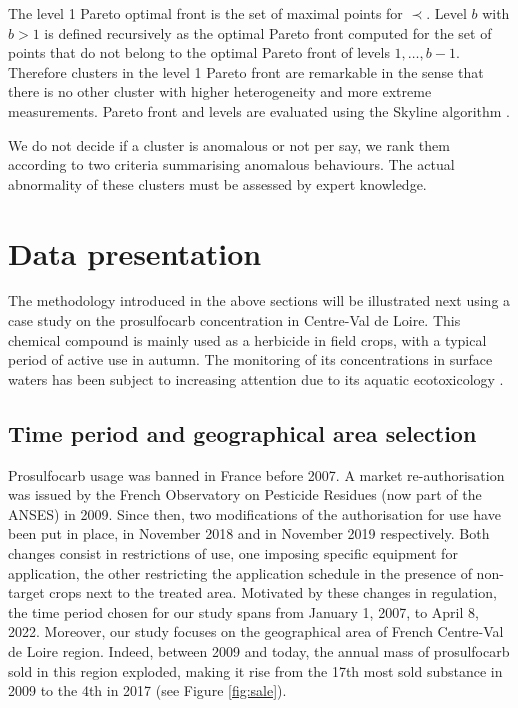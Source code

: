 The level 1 Pareto optimal front is the set of maximal points for $\prec$. Level $b$ with $b>1$ is defined recursively as the optimal Pareto front computed for the set of points that do not belong to the optimal Pareto front of levels $1,\ldots,b-1$. 
Therefore clusters in the level 1 Pareto front are remarkable in the sense that there is no other cluster with higher heterogeneity and more extreme measurements. Pareto front and levels are evaluated using the Skyline algorithm \cite{914855,endres2015scalagon}. 

We do not decide if a cluster is anomalous or not per say, we rank them according to two criteria summarising anomalous behaviours. The actual abnormality of these clusters must be assessed by expert knowledge.


\section{Data presentation}\label{section:data}

The methodology introduced in the above sections will be illustrated next using a case study on the prosulfocarb  concentration \cite{Prosulfocarb:NIH:url} in Centre-Val de Loire. This chemical compound is mainly used as a herbicide in field crops, with a typical period of active use in autumn. The monitoring of its concentrations in surface waters has been subject to increasing attention due to its aquatic ecotoxicology \cite{PPV,Prosulfocarb:PPDB}.

\subsection{Time period and geographical area selection}
\label{section:data-naiade}

Prosulfocarb usage was banned in France before 2007. A market re-authorisation was issued by the French Observatory on Pesticide Residues (now part of the ANSES) in 2009.
Since then, two modifications of the authorisation for use have been put in place, in November 2018 and in November 2019 respectively. Both changes consist in restrictions of use, one imposing specific equipment for application, the other restricting the application schedule in the presence of non-target crops next to the treated area. Motivated by these changes in regulation, the time period chosen for our study spans from January 1, 2007, to April 8, 2022.
Moreover, our study focuses on the geographical area of French Centre-Val de Loire region. Indeed, between 2009 and today, the annual mass of prosulfocarb sold in this region  exploded, making it rise from the 17th most sold substance in 2009 to the 4th in 2017 (see Figure \ref{fig:sale}). 


